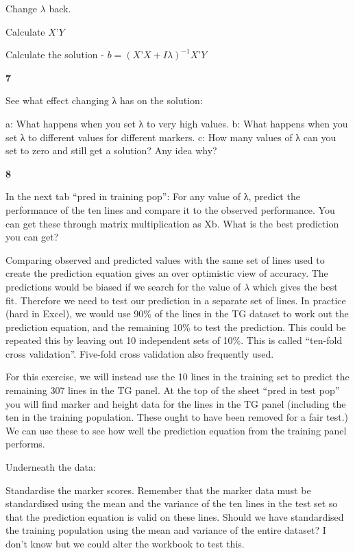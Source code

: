 \documentclass[
]{book}
\makeatletter
\newenvironment{kframe}{%
\medskip{}
\setlength{\fboxsep}{.8em}
 \def\at@end@of@kframe{}%
 \ifinner\ifhmode%
  \def\at@end@of@kframe{\end{minipage}}%
  \begin{minipage}{\columnwidth}%
 \fi\fi%
 \def\FrameCommand##1{\hskip\@totalleftmargin \hskip-\fboxsep
 \colorbox{shadecolor}{##1}\hskip-\fboxsep
     \hskip-\linewidth \hskip-\@totalleftmargin \hskip\columnwidth}%
 \MakeFramed {\advance\hsize-\width
   \@totalleftmargin\z@ \linewidth\hsize
   \@setminipage}}%
 {\par\unskip\endMakeFramed%
 \at@end@of@kframe}
\newenvironment{rmdblock}[1]
  {
  \begin{itemize}
  \renewcommand{\labelitemi}{
    \raisebox{-.7\height}[0pt][0pt]{
      {\setkeys{Gin}{width=3em,keepaspectratio}\texttt{[image: images/\#1]}}
    }
  }
  \setlength{\fboxsep}{1em}
  \begin{kframe}
  \item
  }
  {
  \end{kframe}
  \end{itemize}
  }
\newenvironment{rmdquiz}
  {\begin{rmdblock}{quiz}}
  {\end{rmdblock}}
\makeatother
\begin{document}
Change \(λ\) back.

Calculate \(X’Y\)

Calculate the solution - \(b = (X’X+Iλ)^{-1} X’Y\)

\begin{rmdquiz}
\textbf{7}

See what effect changing λ has on the solution:

a: What happens when you set λ to very high values.
b: What happens when you set λ to different values for different markers.
c: How many values of λ can you set to zero and still get a solution? Any idea why?
\end{rmdquiz}

\begin{rmdquiz}
\textbf{8}

In the next tab ``pred in training pop'': For any value of λ, predict the performance of the ten lines and compare it to the observed performance. You can get these through matrix multiplication as Xb. What is the best prediction you can get?
\end{rmdquiz}

Comparing observed and predicted values with the same set of lines used to create the prediction equation gives an over optimistic view of accuracy. The predictions would be biased if we search for the value of \(λ\) which gives the best fit. Therefore we need to test our prediction in a separate set of lines. In practice (hard in Excel), we would use 90\% of the lines in the TG dataset to work out the prediction equation, and the remaining 10\% to test the prediction. This could be repeated this by leaving out 10 independent sets of 10\%. This is called ``ten-fold cross validation''. Five-fold cross validation also frequently used.

For this exercise, we will instead use the 10 lines in the training set to predict the remaining 307 lines in the TG panel. At the top of the sheet ``pred in test pop'' you will find marker and height data for the lines in the TG panel (including the ten in the training population. These ought to have been removed for a fair test.) We can use these to see how well the prediction equation from the training panel performs.

Underneath the data:

Standardise the marker scores. Remember that the marker data must be standardised using the mean and the variance of the ten lines in the test set so that the prediction equation is valid on these lines. Should we have standardised the training population using the mean and variance of the entire dataset? I don't know but we could alter the workbook to test this.
\end{document}

